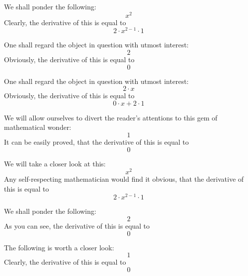\documentclass{article}
\begin{document}
We shall ponder the following:
\begin{equation}
x ^{2 } 
\end{equation}
Clearly, the derivative of this is equal to
\begin{equation}
2 \cdot x ^{2 - 1 } \cdot 1 
\end{equation}

One shall regard the object in question with utmost interest:
\begin{equation}
2 
\end{equation}
Obviously, the derivative of this is equal to
\begin{equation}
0 
\end{equation}

One shall regard the object in question with utmost interest:
\begin{equation}
2 \cdot x 
\end{equation}
Obviously, the derivative of this is equal to
\begin{equation}
0 \cdot x + 2 \cdot 1 
\end{equation}

We will allow ourselves to divert the reader's attentions to this gem of mathematical wonder:
\begin{equation}
1 
\end{equation}
It can be easily proved, that the derivative of this is equal to
\begin{equation}
0 
\end{equation}

We will take a closer look at this:
\begin{equation}
x ^{2 } 
\end{equation}
Any self-respecting mathematician would find it obvious, that the derivative of this is equal to
\begin{equation}
2 \cdot x ^{2 - 1 } \cdot 1 
\end{equation}

We shall ponder the following:
\begin{equation}
2 
\end{equation}
As you can see, the derivative of this is equal to
\begin{equation}
0 
\end{equation}

The following is worth a closer look:
\begin{equation}
1 
\end{equation}
Clearly, the derivative of this is equal to
\begin{equation}
0 
\end{equation}
\end{document}
